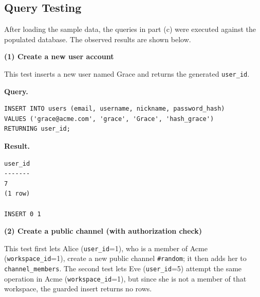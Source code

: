 \documentclass[11pt,letterpaper]{article}
\begin{document}
\begin{figure}[H]
\end{figure}

\subsection*{Query Testing}
After loading the sample data, the queries in part (c) were executed against
the populated database. The observed results are shown below.

\noindent\textbf{(1) Create a new user account}

This test inserts a new user named Grace and returns the generated
\texttt{user\_id}.

\noindent\textbf{Query.}
\begin{lstlisting}
INSERT INTO users (email, username, nickname, password_hash)
VALUES ('grace@acme.com', 'grace', 'Grace', 'hash_grace')
RETURNING user_id;
\end{lstlisting}

\noindent\textbf{Result.}
\begin{lstlisting}[style=result]
user_id
-------
7
(1 row)

INSERT 0 1
\end{lstlisting}

\noindent\textbf{(2) Create a public channel (with authorization check)}

This test first lets Alice (\texttt{user\_id}=1), who is a member of Acme
(\texttt{workspace\_id}=1), create a new public channel \texttt{\#random}; it
then adds her to \texttt{channel\_members}. The second test lets Eve
(\texttt{user\_id}=5) attempt the same operation in Acme
(\texttt{workspace\_id}=1), but since she is not a member of that workspace,
the guarded insert returns no rows.
\end{document}
